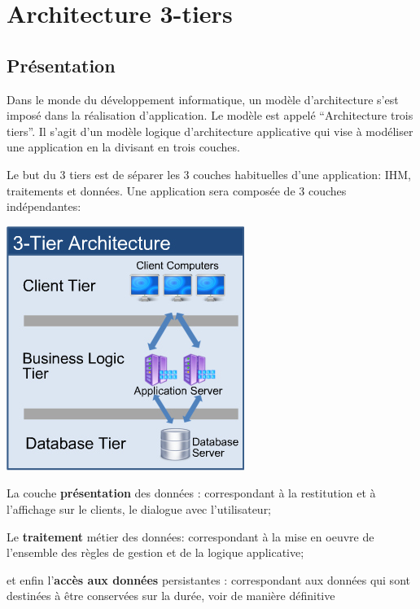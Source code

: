 \section{Architecture 3-tiers}
\label{ch:3-tiers}

\subsection{Présentation}

Dans le monde du développement informatique, un modèle d’architecture s’est imposé dans la réalisation d’application. Le modèle est appelé “Architecture trois tiers”. 
Il s’agit d’un modèle logique d’architecture applicative qui vise à modéliser une application en la divisant en trois couches.

Le but du 3 tiers est de séparer les 3 couches habituelles d’une application: IHM, traitements et données.
Une application sera composée de 3 couches indépendantes:

\begin{center}
\includegraphics[scale=0.6]{img/3tier.jpg}
\label{Graphique technologie ajax}
\end{center}
 

\begin{list}{•}{}

  \item 
   La couche \textbf{présentation} des données : correspondant à la restitution et à l’affichage sur le clients, le dialogue avec l’utilisateur;
  
  \item
  Le \textbf{traitement} métier des données: correspondant à la mise en oeuvre de l'ensemble des règles de gestion et de la logique applicative;
  
  \item
  et enfin l’\textbf{accès aux données} persistantes : correspondant aux données qui sont destinées à être conservées sur la durée, voir de manière définitive   
  
\end{list}

